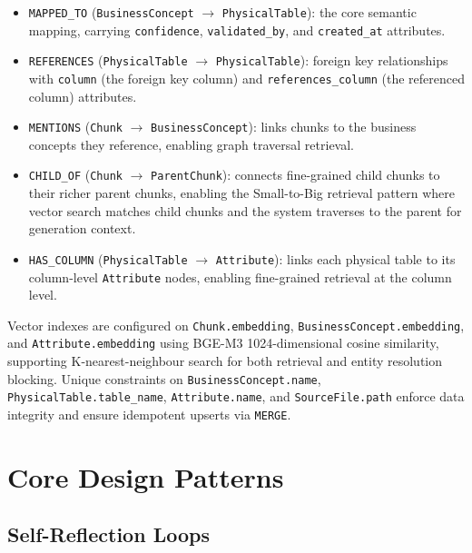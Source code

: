 \begin{itemize}
    \item \texttt{MAPPED\_TO} (\texttt{BusinessConcept} $\rightarrow$ \texttt{PhysicalTable}): the core semantic mapping, carrying \texttt{confidence}, \texttt{validated\_by}, and \texttt{created\_at} attributes.

    \item \texttt{REFERENCES} (\texttt{PhysicalTable} $\rightarrow$ \texttt{PhysicalTable}): foreign key relationships with \texttt{column} (the foreign key column) and \texttt{references\_column} (the referenced column) attributes.

    \item \texttt{MENTIONS} (\texttt{Chunk} $\rightarrow$ \texttt{BusinessConcept}): links chunks to the business concepts they reference, enabling graph traversal retrieval.

    \item \texttt{CHILD\_OF} (\texttt{Chunk} $\rightarrow$ \texttt{ParentChunk}): connects fine-grained child chunks to their richer parent chunks, enabling the Small-to-Big retrieval pattern where vector search matches child chunks and the system traverses to the parent for generation context.

    \item \texttt{HAS\_COLUMN} (\texttt{PhysicalTable} $\rightarrow$ \texttt{Attribute}): links each physical table to its column-level \texttt{Attribute} nodes, enabling fine-grained retrieval at the column level.
\end{itemize}

Vector indexes are configured on \texttt{Chunk.\allowbreak{}embedding}, \texttt{Business\allowbreak{}Concept.\allowbreak{}embedding}, and \texttt{Attribute.\allowbreak{}embedding} using BGE-M3 1024-dimensional cosine similarity, supporting K-nearest-neighbour search for both retrieval and entity resolution blocking. Unique constraints on \texttt{Business\allowbreak{}Concept.name}, \texttt{Physical\allowbreak{}Table.table\_name}, \texttt{Attribute.name}, and \texttt{Source\allowbreak{}File.path} enforce data integrity and ensure idempotent upserts via \texttt{MERGE}.

\section{Core Design Patterns}
\label{sec:sd:patterns}

\subsection{Self-Reflection Loops}
\label{sec:sd:self_reflection}

